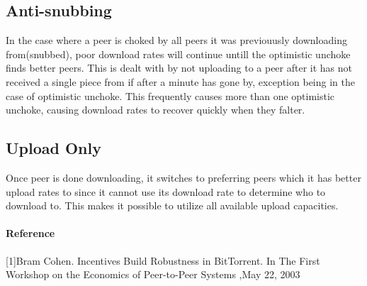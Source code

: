 \documentclass[24 pts]{article}
\begin{document}
\subsection{Anti-snubbing}
In the case where a peer is choked by all peers it was previouusly downloading from(snubbed), poor download rates will continue untill the optimistic unchoke finds better peers. This is dealt with by not uploading to a peer after it has not received a single piece from if after a minute has gone by, exception being in the case of optimistic unchoke. This frequently causes more than one optimistic unchoke, causing download rates to recover quickly when they falter.

\subsection{Upload Only}
Once peer is done downloading, it switches to preferring peers which it has better upload rates to since it cannot use its download rate to determine who to download to. This makes it possible to utilize all available upload capacities.

\paragraph{Reference}
[1]Bram Cohen. Incentives Build Robustness in BitTorrent. In The First Workshop on the Economics of Peer-to-Peer Systems ,May 22, 2003
\end{document}
